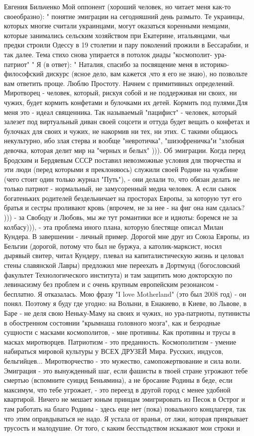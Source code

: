 Евгения Бильченко
Мой оппонент (хороший человек, но читает меня как-то своеобразно): " понятие эмиграции на сегодняшний день размыто. Те украинцы, которых многие считали украинцами, могут оказаться коренными немцами, которые занимались сельским хозяйством при Екатерине, итальянцами, чьи предки строили Одессу в 19 столетии и пару поколений прожили в Бессарабии, и так далее. Тема стихо снова упирается в потолок диады "космополит- ура-патриот" " Я (в ответ): " Наталия, спасибо за посвящение меня в историко-философский дискурс (ясное дело, вам кажется ,что я его не знаю), но позвольте вам ответить проще. Люблю Простоту. Начнем с примитивных определений. Миротворец - человек, который, рискуя собой и не поддерживая ни своих, ни чужих, будет кормить конфетами и булочками их детей. Кормить под пулями.Для меня это - идеал священника. Так называемый "пацифист" - человек, который залезет под виртуальный диван своей соцсети и оттуда будет вещать о конфетах и булочках для своих и чужих, не накормив ни тех, ни этих. С такими общаюсь некультурно, ибо злая стерва и вообще "невротичка", "шизофреничка"и "злобная девочка, которая делит мир на "черных и белых" ))). Об эмиграции. Когда перед Бродским и Бердяевым СССР поставил невозможные условия для творчества и эти люди (перед которыми я преклоняюсь) служили своей Родине на чужбине (чего стоит один только журнал "Путь"), - они делали то, что обязан делать не только патриот - нормальный, не замусоренный медиа человек. А если сынок богатеньких родителей бездельничает на просторах Европы, за которую тут его братья и сестры проливают кровь (впрочем, не за нее - на фиг она нам сдалась? ))) - за Свободу и Любовь, мы же тут романтики все и идиоты: боремся не за колбасу))), - эта проблема иного плана, которую блестяще описал Милан Кундера. В завершении - личный пример. Дорогой мне друг из Союза Европы, из Бельгии (дорогой, потому что был не буржуа, а католик-марксист, носил дырявый свитер, читал Кундеру, плевал на капиталистическую жизнь и целовал стены славянской Лавры) предложил мне переехать в Дортмунд (богословский факультет Технологического института) и там защитить мою докторскую по левинасизму без проблем и с очень крупным европейским резонансом - бесплатно. Я отказалась. Мою фразу "I love Motherland" (это был 2008 год) - он понял. Поэтому я буду где угодно: на Волыни, в Енакиево, в Киеве, во Львове, в Баре - не деля свою Неньку-Маму на своих и чужих, но ура-патриоты, путинисты в обостренном состоянии "крымнаша головного мозга", как и безродные сущности с масками космополитов, - мне противны. Как противны и трусы в масках миротворцев. Патриотизм - это преданность. Космополитизм - умение набираться мировой культуры у ВСЕХ ДРУЗЕЙ Мира. Русских, индусов, бельгийцев... Миротворчество - это мужество, самопожертвование и сила воли. Эмиграция - это вынужденный шаг, если фашисты в твоей стране угрожают тебе смертью (вспомните суицид Беньямина), а не бросание Родины в беде, если максимум, что тебе угрожает, - это переезд в другой город с менее удобной квартирой. Ничего не мешает юным принцам эмигрировать из Песок в Острог и там работать на благо Родины - здесь еще нет (пока) повального концлагеря, так что этим оправдываться не надо. Я устала от вранья, от лжи, которая прикрывает трусость и малодушие. От того, с каким бесстыдством искажают мои строки и 